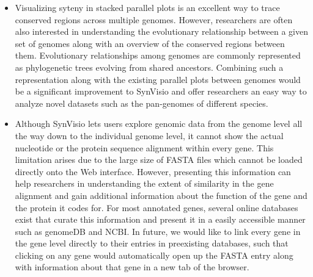 \begin{itemize}
    \item Visualizing syteny in stacked parallel plots is an excellent way to trace conserved regions across multiple genomes. However, researchers are often also interested in understanding the evolutionary relationship between a given set of genomes along with an overview of the conserved regions between them. Evolutionary relationships among genomes are commonly represented as phylogenetic trees evolving from shared ancestors. Combining such a representation along with the existing parallel plots between genomes would be a significant improvement to SynVisio and offer researchers an easy way to analyze novel datasets such as the pan-genomes of different species.
    
    \item Although SynVisio lets users explore genomic data from the genome level all the way down to the individual genome level, it cannot show the actual nucleotide or the protein sequence alignment within every gene. This limitation arises due to the large size of FASTA files which cannot be loaded directly onto the Web interface. However, presenting this information can help researchers in understanding the extent of similarity in the gene alignment and gain additional information about the function of the gene and the protein it codes for. For most annotated genes, several online databases exist that curate this information and present it in a easily accessible manner such as genomeDB and NCBI. In future, we would like to link every gene in the gene level directly to their entries in preexisting databases, such that clicking on any gene would automatically open up the FASTA entry along with information about that gene in a new tab of the browser.    


\end{itemize}
 
